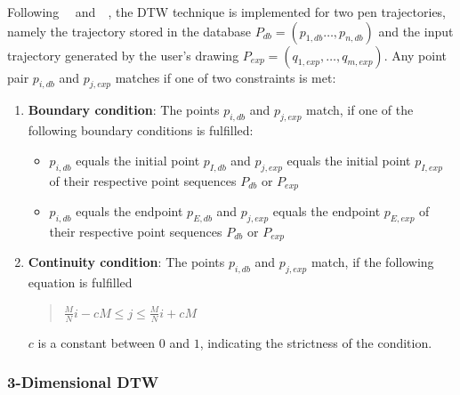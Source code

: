 Following~~\citeyear{Vuori2001} 
and~~\citeyear{Niels2005}, 
the DTW technique is implemented for two pen trajectories, 
namely the trajectory stored in the database 
\(P_{db} = (p_{1,db}\ldots,p_{n,db})\) and the input trajectory generated by
the user's drawing \(P_{exp} = (q_{1,exp},\ldots,q_{m,exp})\).
Any point pair \(p_{i,db}\) and \(p_{j,exp}\) matches if one of two constraints 
is met:
\begin{enumerate}
  \item \textbf{Boundary condition}: The points \(p_{i,db}\) and \(p_{j,exp}\)  
         match, if one of the following boundary conditions is fulfilled:
        \begin{itemize}
          \item \(p_{i,db}\) equals the initial point \(p_{I,db} \) 
                and \(p_{j,exp}\) equals the initial point \(p_{I,exp}\)
                of their respective point sequences \(P_{db}\) or \(P_{exp}\)

          \item \(p_{i,db}\) equals the endpoint \(p_{E,db} \) 
                and \(p_{j,exp}\) equals the endpoint \(p_{E,exp}\)
                of their respective point sequences \(P_{db}\) or \(P_{exp}\)
        \end{itemize}

  \item \textbf{Continuity condition}: The points \(p_{i,db}\) and \(p_{j,exp}\)  
         match, if the following equation is fulfilled \\
         \begin{quote}
         \(
            \frac{M}{N}i - cM \le j \le \frac{M}{N}i + cM
         \)
         \end{quote}
         \(c\) is a constant between \(0\) and \(1\), indicating the 
         strictness of the condition.
\end{enumerate}

\subsubsection{3-Dimensional DTW}
\label{sec:hwre:3ddtw}

